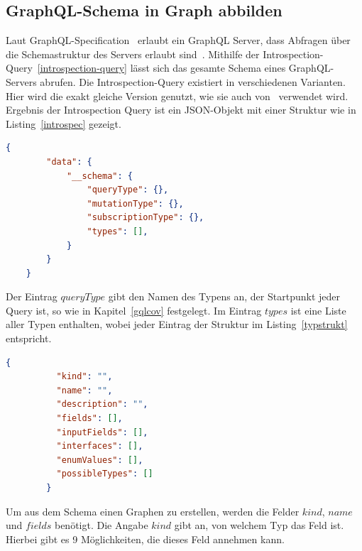 \subsection{GraphQL-Schema in Graph abbilden}
\label{schemagraph}

Laut GraphQL-Specification~\cite{graphqlspecification} erlaubt ein GraphQL Server, dass Abfragen über die Schemastruktur des
Servers erlaubt sind~\cite[vgl. 4. Introspection]{graphqlspecification}.
Mithilfe der Introspection-Query~\ref{introspection-query} lässt sich das gesamte Schema eines GraphQL-Servers abrufen.
Die Introspection-Query existiert in verschiedenen Varianten.
Hier wird die exakt gleiche Version genutzt, wie sie auch von~\cite{property-based-testing} verwendet wird.
Ergebnis der Introspection Query ist ein JSON-Objekt mit einer Struktur wie in Listing~\ref{introspec} gezeigt.

\begin{lstlisting}[language=json, caption={Schema-Response},captionpos=b]
    {
        "data": {
            "__schema": {
                "queryType": {},
                "mutationType": {},
                "subscriptionType": {},
                "types": [],
            }
        }
    }
\end{lstlisting}
\label{introspec}

Der Eintrag $queryType$ gibt den Namen des Typens an, der Startpunkt jeder Query ist, so wie in Kapitel~\ref{gqlcov} festgelegt.
Im Eintrag $types$ ist eine Liste aller Typen enthalten, wobei jeder Eintrag der Struktur im Listing~\ref{typstrukt} entspricht.

\begin{lstlisting}[language=json, caption={Type-Field},captionpos=b]
        {
          "kind": "",
          "name": "",
          "description": "",
          "fields": [],
          "inputFields": [],
          "interfaces": [],
          "enumValues": [],
          "possibleTypes": []
        }
\end{lstlisting}
\label{typstrukt}


Um aus dem Schema einen Graphen zu erstellen, werden die Felder $kind$, $name$ und $fields$ benötigt.
Die Angabe $kind$ gibt an, von welchem Typ das Feld ist.
Hierbei gibt es 9 Möglichkeiten, die dieses Feld annehmen kann.

